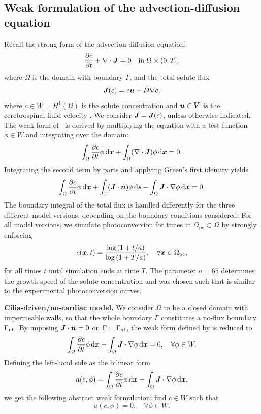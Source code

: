 \documentclass{WileyMSP-template}
\begin{document}
\subsection{Weak formulation of the advection-diffusion equation}
\label{subsec:adv_diff_eq_weak_form}
Recall the strong form of the advection-diffusion equation:
\begin{equation}
    \frac{\partial c}{\partial t} + \nabla\cdot\bm{J} = 0 \quad\mathrm{in} \ \Omega\times(0, T],
    \label{eq:adv_diff_strong_DG}
\end{equation}
where $\Omega$ is the domain with boundary $\Gamma$, and the total solute flux
\begin{equation*}
    \bm{J}(c) = c\bm{u} - D\nabla c,
\end{equation*}
where $c\in W=H^1(\Omega)$ is the solute concentration and
$\bm{u}\in\bm{V}$ is the cerebrospinal fluid velocity .
We consider $\bm{J} = \bm{J}(c)$, unless otherwise indicated.
The weak form of~ is derived by
multiplying the equation with a test function $\phi \in W$ and integrating over the domain: 
\begin{equation*}
    \int_{\Omega}\frac{\partial c}{\partial t}\phi \, \mathrm d\bm{x} + \int_{\Omega}(\nabla\cdot\bm{J})\phi \, \mathrm d\bm{x} = 0.
\end{equation*}
Integrating the second term by parts and applying Green's first identity yields
\begin{equation}
    \int_{\Omega}\frac{\partial c}{\partial t}\phi \, \mathrm d\bm{x} + \int_{\Gamma}(\bm{J}\cdot\bm{n})\phi \, \mathrm ds
    - \int_{\Omega}\bm{J}\cdot\nabla\phi \, \mathrm d\bm{x} = 0.\label{eq:adv_diff_weak_formA1}
\end{equation}
The boundary integral of the total flux is handled differently for
the three different model versions, depending on the boundary conditions considered.
For all model versions, we simulate photoconversion for times in 
$\Omega_{\mathrm{pc}}\subset\Omega$ by strongly enforcing
\begin{equation}
    c(\bm{x}, t)=\frac{\log{(1+t/a)}}{\log{(1+T/a)}},
    \quad \forall \bm{x} \in \Omega_{\mathrm{pc}},
    \label{eq:photoconversion_curve_appendix}
\end{equation}
for all times $t$ until simulation ends at time $T$.
The parameter $a=65$ determines the growth speed of
the solute concentration and was chosen such that
 is similar
to the experimental photoconversion curves.

\textbf{Cilia-driven/no-cardiac model.} We consider $\Omega$ to be
a closed domain with impermeable walls, so that the whole boundary
$\Gamma$ constitutes a no-flux boundary $\Gamma_{\mathrm{nf}}$.
By imposing $\bm{J}\cdot\bm{n}=0$ on $\Gamma=\Gamma_{\mathrm{nf}}$, 
the weak form defined by  is reduced to
\begin{equation*}
    \int_{\Omega}\frac{\partial c}{\partial t}\phi \, \mathrm d\bm{x} - \int_{\Omega}\bm{J}\cdot\nabla\phi \, \mathrm d\bm{x} = 0, \quad\forall\phi\in W.
\end{equation*}
Defining the left-hand side as the bilinear form
\begin{equation*}
    a(c, \phi) = \int_{\Omega}\frac{\partial c}{\partial t}\phi \, \mathrm d\bm{x} - \int_{\Omega}\bm{J}\cdot\nabla\phi \, \mathrm d\bm{x}, 
\end{equation*}
we get the following abstract weak formulation: find $c\in W$ such that
\begin{equation*}
    a(c, \phi) = 0, \quad\forall\phi\in W.
\end{equation*}
\end{document}
